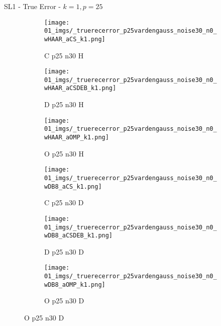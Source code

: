 \begin{frame}{SL1 - True Error - $k=1,p=25$}{}
\begin{figure}
\vspace{5pt}

\begin{subfigure}{0.13\textwidth}
\texttt{[image: 01\_imgs/\_truerecerror\_p25vardengauss\_noise30\_n0\_wHAAR\_aCS\_k1.png]}
\caption*{\tiny C p25 n30 H}
\end{subfigure}
\begin{subfigure}{0.13\textwidth}
\texttt{[image: 01\_imgs/\_truerecerror\_p25vardengauss\_noise30\_n0\_wHAAR\_aCSDEB\_k1.png]}
\caption*{\tiny D p25 n30 H}
\end{subfigure}
\begin{subfigure}{0.13\textwidth}
\texttt{[image: 01\_imgs/\_truerecerror\_p25vardengauss\_noise30\_n0\_wHAAR\_aOMP\_k1.png]}
\caption*{\tiny O p25 n30 H}
\end{subfigure}
\begin{subfigure}{0.13\textwidth}
\texttt{[image: 01\_imgs/\_truerecerror\_p25vardengauss\_noise30\_n0\_wDB8\_aCS\_k1.png]}
\caption*{\tiny C p25 n30 D}
\end{subfigure}
\begin{subfigure}{0.13\textwidth}
\texttt{[image: 01\_imgs/\_truerecerror\_p25vardengauss\_noise30\_n0\_wDB8\_aCSDEB\_k1.png]}
\caption*{\tiny D p25 n30 D}
\end{subfigure}
\begin{subfigure}{0.13\textwidth}
\texttt{[image: 01\_imgs/\_truerecerror\_p25vardengauss\_noise30\_n0\_wDB8\_aOMP\_k1.png]}
\caption*{\tiny O p25 n30 D}
\end{subfigure}
\end{figure}
\end{frame}

